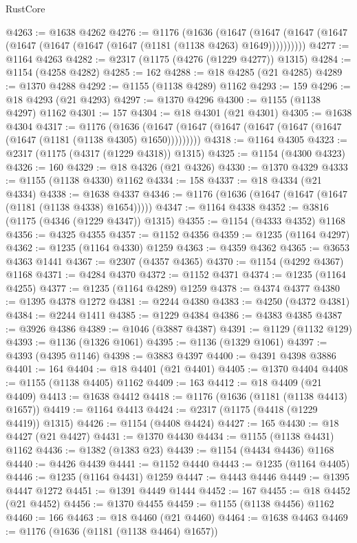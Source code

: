 \begin{lexlean}{RustCore}
\begin{coremodule}
@4263 := @1638 @4262
@4276 := @1176
    (@1636
      (@1647 (@1647 (@1647 (@1647 (@1647 (@1647 (@1647 (@1647 (@1181 (@1138 @4263) @1649))))))))))
@4277 := @1164 @4263
@4282 := @2317 (@1175 (@4276 (@1229 @4277)) @1315)
@4284 := @1154 (@4258 @4282)
@4285 := 162
@4288 := @18 @4285 (@21 @4285)
@4289 := @1370 @4288
@4292 := @1155 (@1138 @4289) @1162
@4293 := 159
@4296 := @18 @4293 (@21 @4293)
@4297 := @1370 @4296
@4300 := @1155 (@1138 @4297) @1162
@4301 := 157
@4304 := @18 @4301 (@21 @4301)
@4305 := @1638 @4304
@4317 := @1176
    (@1636 (@1647 (@1647 (@1647 (@1647 (@1647 (@1647 (@1647 (@1181 (@1138 @4305) @1650)))))))))
@4318 := @1164 @4305
@4323 := @2317 (@1175 (@4317 (@1229 @4318)) @1315)
@4325 := @1154 (@4300 @4323)
@4326 := 160
@4329 := @18 @4326 (@21 @4326)
@4330 := @1370 @4329
@4333 := @1155 (@1138 @4330) @1162
@4334 := 158
@4337 := @18 @4334 (@21 @4334)
@4338 := @1638 @4337
@4346 := @1176 (@1636 (@1647 (@1647 (@1647 (@1181 (@1138 @4338) @1654)))))
@4347 := @1164 @4338
@4352 := @3816 (@1175 (@4346 (@1229 @4347)) @1315)
@4355 := @1154 (@4333 @4352) @1168
@4356 := @4325 @4355
@4357 := @1152 @4356
@4359 := @1235 (@1164 @4297)
@4362 := @1235 (@1164 @4330) @1259
@4363 := @4359 @4362
@4365 := @3653 @4363 @1441
@4367 := @2307 (@4357 @4365)
@4370 := @1154 (@4292 @4367) @1168
@4371 := @4284 @4370
@4372 := @1152 @4371
@4374 := @1235 (@1164 @4255)
@4377 := @1235 (@1164 @4289) @1259
@4378 := @4374 @4377
@4380 := @1395 @4378 @1272
@4381 := @2244 @4380
@4383 := @4250 (@4372 @4381)
@4384 := @2244 @1411
@4385 := @1229 @4384
@4386 := @4383 @4385
@4387 := @3926 @4386
@4389 := @1046 (@3887 @4387)
@4391 := @1129 (@1132 @129)
@4393 := @1136 (@1326 @1061)
@4395 := @1136 (@1329 @1061)
@4397 := @4393 (@4395 @1146)
@4398 := @3883 @4397
@4400 := @4391 @4398 @3886
@4401 := 164
@4404 := @18 @4401 (@21 @4401)
@4405 := @1370 @4404
@4408 := @1155 (@1138 @4405) @1162
@4409 := 163
@4412 := @18 @4409 (@21 @4409)
@4413 := @1638 @4412
@4418 := @1176 (@1636 (@1181 (@1138 @4413) @1657))
@4419 := @1164 @4413
@4424 := @2317 (@1175 (@4418 (@1229 @4419)) @1315)
@4426 := @1154 (@4408 @4424)
@4427 := 165
@4430 := @18 @4427 (@21 @4427)
@4431 := @1370 @4430
@4434 := @1155 (@1138 @4431) @1162
@4436 := @1382 (@1383 @23)
@4439 := @1154 (@4434 @4436) @1168
@4440 := @4426 @4439
@4441 := @1152 @4440
@4443 := @1235 (@1164 @4405)
@4446 := @1235 (@1164 @4431) @1259
@4447 := @4443 @4446
@4449 := @1395 @4447 @1272
@4451 := @1391 @4449 @1444
@4452 := 167
@4455 := @18 @4452 (@21 @4452)
@4456 := @1370 @4455
@4459 := @1155 (@1138 @4456) @1162
@4460 := 166
@4463 := @18 @4460 (@21 @4460)
@4464 := @1638 @4463
@4469 := @1176 (@1636 (@1181 (@1138 @4464) @1657))

\end{coremodule}
\end{lexlean}
